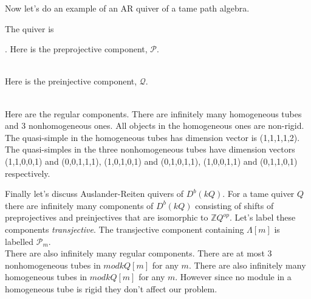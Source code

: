 \indent Now let's do an example of an AR quiver of a tame path algebra.\\
\begin{example}
The quiver is .
\indent Here is the preprojective component, $\mathcal{P}$.\\
\\
Here is the preinjective component, $\mathcal{Q}$.\\
\\
\indent Here are the regular components. There are infinitely many homogeneous tubes and 3 nonhomogeneous ones. All objects in the homogeneous ones are non-rigid. The quasi-simple in the homogeneous tubes has dimension vector is (1,1,1,1,2). The quasi-simples in the three nonhomogeneous tubes have dimension vectors (1,1,0,0,1) and (0,0,1,1,1), (1,0,1,0,1) and (0,1,0,1,1), (1,0,0,1,1) and (0,1,1,0,1) respectively.\\
\end{example}
\indent Finally let's discuss Auslander-Reiten quivers of $D^b(kQ)$. For a tame quiver $Q$ there are infinitely many components of $D^b(kQ)$ consisting of shifts of preprojectives and preinjectives that are isomorphic to $\mathbb{Z}Q^{op}$. Let's label these components \textit{transjective}. The transjective component containing $\Lambda[m]$ is labelled $\mathcal{P}_m$.\\
\indent There are also infinitely many regular components. There are at most 3 nonhomogeneous tubes in $mod kQ[m]$ for any $m$. There are also infinitely many homogeneous tubes in $mod kQ[m]$ for any $m$. However since no module in a homogeneous tube is rigid they don't affect our problem.\\
